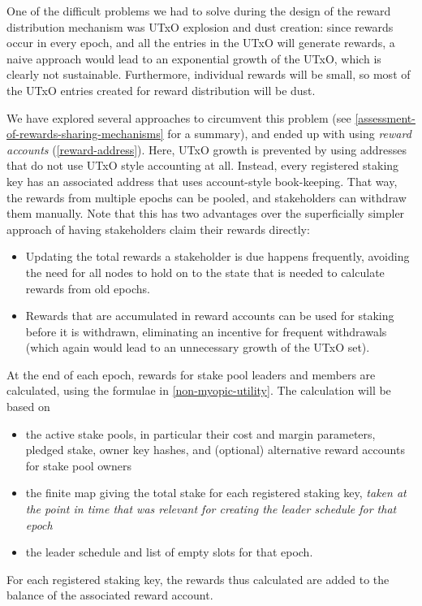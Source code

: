 \documentclass[11pt,a4paper]{article}
\begin{document}
One of the difficult problems we had to solve during the design of the
reward distribution mechanism was UTxO explosion and dust creation:
since rewards occur in every epoch, and all the entries in the UTxO
will generate rewards, a naive approach would lead to an exponential
growth of the UTxO, which is clearly not sustainable. Furthermore,
individual rewards will be small, so most of the UTxO entries created
for reward distribution will be dust.

We have explored several approaches to circumvent this problem
(see \cref{assessment-of-rewards-sharing-mechanisms} for a summary),
and ended up with using \emph{reward accounts}
(\cref{reward-address}). Here, UTxO growth is prevented by using
addresses that do not use UTxO style accounting at all. Instead, every
registered staking key has an associated address that uses
account-style book-keeping. That way, the rewards from multiple epochs
can be pooled, and stakeholders can withdraw them manually. Note that
this has two advantages over the superficially simpler approach of
having stakeholders claim their rewards directly:
\begin{itemize}
\item Updating the total rewards a stakeholder is due happens
  frequently, avoiding the need for all nodes to hold on to the state
  that is needed to calculate rewards from old epochs.
\item Rewards that are accumulated in reward accounts can be used for
  staking before it is withdrawn, eliminating an incentive for
  frequent withdrawals (which again would lead to an unnecessary
  growth of the UTxO set).
\end{itemize}

At the end of each epoch, rewards for stake pool leaders and members
are calculated, using the formulae in \cref{non-myopic-utility}. The
calculation will be based on
\begin{itemize}
\item the active stake pools, in particular their cost and margin
  parameters, pledged stake, owner key hashes, and (optional)
  alternative reward accounts for stake pool owners
\item the finite map giving the total stake for each registered
  staking key, \emph{taken at the point in time that was relevant for
    creating the leader schedule for that epoch}
\item the leader schedule and list of empty slots for that epoch.
\end{itemize}
For each registered staking key, the rewards thus calculated are added
to the balance of the associated reward account.
\end{document}
